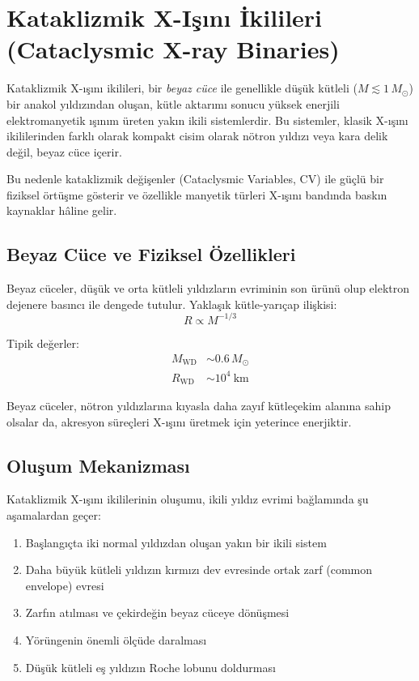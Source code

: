 \section{Kataklizmik X-Işını İkilileri (Cataclysmic X-ray Binaries)}

Kataklizmik X-ışını ikilileri, bir \emph{beyaz cüce} ile genellikle düşük kütleli ($M \lesssim 1\,M_\odot$) bir anakol yıldızından oluşan, kütle aktarımı sonucu yüksek enerjili elektromanyetik ışınım üreten yakın ikili sistemlerdir. Bu sistemler, klasik X-ışını ikililerinden farklı olarak kompakt cisim olarak nötron yıldızı veya kara delik değil, beyaz cüce içerir.

Bu nedenle kataklizmik değişenler (Cataclysmic Variables, CV) ile güçlü bir fiziksel örtüşme gösterir ve özellikle manyetik türleri X-ışını bandında baskın kaynaklar hâline gelir.

\subsection{Beyaz Cüce ve Fiziksel Özellikleri}

Beyaz cüceler, düşük ve orta kütleli yıldızların evriminin son ürünü olup elektron dejenere basıncı ile dengede tutulur. Yaklaşık kütle-yarıçap ilişkisi:
\begin{equation}
R \propto M^{-1/3}
\end{equation}

Tipik değerler:
\begin{align}
M_{\mathrm{WD}} &\sim 0.6\,M_\odot \\
R_{\mathrm{WD}} &\sim 10^4\ \mathrm{km}
\end{align}

Beyaz cüceler, nötron yıldızlarına kıyasla daha zayıf kütleçekim alanına sahip olsalar da, akresyon süreçleri X-ışını üretmek için yeterince enerjiktir.

\subsection{Oluşum Mekanizması}

Kataklizmik X-ışını ikililerinin oluşumu, ikili yıldız evrimi bağlamında şu aşamalardan geçer:
\begin{enumerate}
    \item Başlangıçta iki normal yıldızdan oluşan yakın bir ikili sistem
    \item Daha büyük kütleli yıldızın kırmızı dev evresinde ortak zarf (common envelope) evresi
    \item Zarfın atılması ve çekirdeğin beyaz cüceye dönüşmesi
    \item Yörüngenin önemli ölçüde daralması
    \item Düşük kütleli eş yıldızın Roche lobunu doldurması
\end{enumerate}

